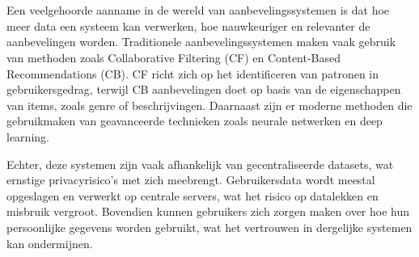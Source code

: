 \section{}%
\label{sec:probleemstelling}


Een veelgehoorde aanname in de wereld van aanbevelingssystemen is dat hoe meer data een systeem kan verwerken, hoe nauwkeuriger en relevanter de aanbevelingen worden. Traditionele aanbevelingssystemen maken vaak gebruik van methoden zoals Collaborative Filtering (CF) en Content-Based Recommendations (CB). CF richt zich op het identificeren van patronen in gebruikersgedrag, terwijl CB aanbevelingen doet op basis van de eigenschappen van items, zoals genre of beschrijvingen. Daarnaast zijn er moderne methoden die gebruikmaken van geavanceerde technieken zoals neurale netwerken en deep learning.

Echter, deze systemen zijn vaak afhankelijk van gecentraliseerde datasets, wat ernstige privacyrisico's met zich meebrengt. Gebruikersdata wordt meestal opgeslagen en verwerkt op centrale servers, wat het risico op datalekken en misbruik vergroot. Bovendien kunnen gebruikers zich zorgen maken over hoe hun persoonlijke gegevens worden gebruikt, wat het vertrouwen in dergelijke systemen kan ondermijnen. 

\section{}%
\label{sec:onderzoeksvraag}


